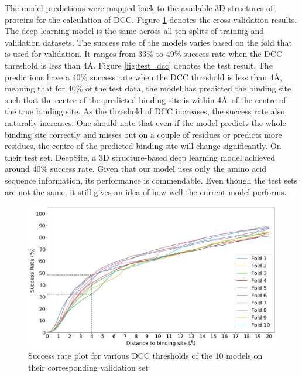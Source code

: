 \documentclass[journal=jacsat,manuscript=article]{achemso}
\begin{document}
The model predictions were mapped back to the available 3D structures of proteins for the calculation of DCC. Figure \ref{fig:valid_dcc} denotes the cross-validation results. The deep learning model is the same across all ten splits of training and validation datasets. The success rate of the models varies based on the fold that is used for validation. It ranges from 33\% to 49\% success rate when the DCC threshold is less than 4\AA. Figure \ref{fig:test_dcc} denotes the test result. The predictions have a 40\% success rate when the DCC threshold is less than 4\AA, meaning that for 40\% of the test data, the model has predicted the binding site such that the centre of the predicted binding site is within 4\AA \ of the centre of the true binding site. As the threshold of DCC increases, the success rate also naturally increases. One should note that even if the model predicts the whole binding site correctly and misses out on a couple of residues or predicts more residues, the centre of the predicted binding site will change significantly. On their test set, DeepSite, a 3D structure-based deep learning model \cite{jimenez2017deepsite} achieved around 40\% success rate. Given that our model uses only the amino acid sequence information, its performance is commendable. Even though the test sets are not the same, it still gives an idea of how well the current model performs.

\vspace{10 mm}
\begin{figure}
    \centering
    \noindent\includegraphics[scale=0.45]{valid_dcc.png}
    \caption{\centering Success rate plot for various DCC thresholds of the 10 models on their corresponding validation set}
    \label{fig:valid_dcc}
\end{figure}
\end{document}
